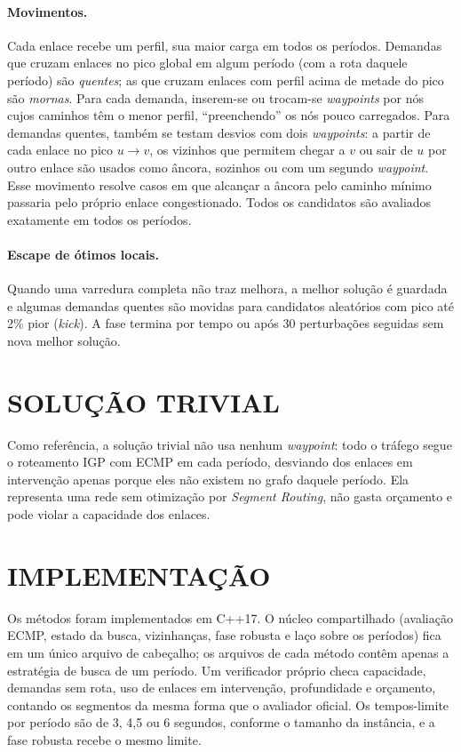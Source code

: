 \paragraph{Movimentos.} Cada enlace recebe um perfil, sua maior carga em todos os períodos. Demandas que cruzam enlaces no pico global em algum período (com a rota daquele período) são \textit{quentes}; as que cruzam enlaces com perfil acima de metade do pico são \textit{mornas}. Para cada demanda, inserem-se ou trocam-se \textit{waypoints} por nós cujos caminhos têm o menor perfil, ``preenchendo'' os nós pouco carregados. Para demandas quentes, também se testam desvios com dois \textit{waypoints}: a partir de cada enlace no pico $u \to v$, os vizinhos que permitem chegar a $v$ ou sair de $u$ por outro enlace são usados como âncora, sozinhos ou com um segundo \textit{waypoint}. Esse movimento resolve casos em que alcançar a âncora pelo caminho mínimo passaria pelo próprio enlace congestionado. Todos os candidatos são avaliados exatamente em todos os períodos.

\paragraph{Escape de ótimos locais.} Quando uma varredura completa não traz melhora, a melhor solução é guardada e algumas demandas quentes são movidas para candidatos aleatórios com pico até 2\% pior (\textit{kick}). A fase termina por tempo ou após 30 perturbações seguidas sem nova melhor solução.

\section{\uppercase{Solução Trivial}}

Como referência, a solução trivial não usa nenhum \textit{waypoint}: todo o tráfego segue o roteamento IGP com ECMP em cada período, desviando dos enlaces em intervenção apenas porque eles não existem no grafo daquele período. Ela representa uma rede sem otimização por \textit{Segment Routing}, não gasta orçamento e pode violar a capacidade dos enlaces.

\section{\uppercase{Implementação}}

Os métodos foram implementados em C++17. O núcleo compartilhado (avaliação ECMP, estado da busca, vizinhanças, fase robusta e laço sobre os períodos) fica em um único arquivo de cabeçalho; os arquivos de cada método contêm apenas a estratégia de busca de um período. Um verificador próprio checa capacidade, demandas sem rota, uso de enlaces em intervenção, profundidade e orçamento, contando os segmentos da mesma forma que o avaliador oficial. Os tempos-limite por período são de 3, 4,5 ou 6 segundos, conforme o tamanho da instância, e a fase robusta recebe o mesmo limite.
